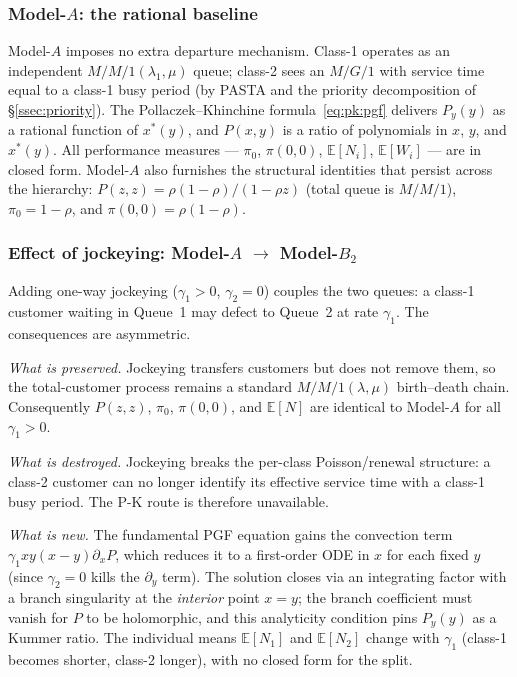 \subsubsection*{Model-\texorpdfstring{$A$}{A}: the rational baseline}

Model-$A$ imposes no extra departure mechanism.
Class-1 operates as an independent $M/M/1(\lambda_1,\mu)$ queue;
class-2 sees an $M/G/1$ with service time equal to a class-1 busy period
(by PASTA and the priority decomposition of \S\ref{ssec:priority}).
The Pollaczek--Khinchine formula~\eqref{eq:pk:pgf} delivers $P_y(y)$
as a rational function of $x^*(y)$, and $P(x,y)$ is a ratio of polynomials
in $x$, $y$, and $x^*(y)$.  All performance measures --- $\pi_0$, $\pi(0,0)$,
$\mathbb{E}[N_i]$, $\mathbb{E}[W_i]$ --- are in closed form.  Model-$A$ also
furnishes the structural identities that persist across the hierarchy:
$P(z,z)=\rho(1-\rho)/(1-\rho z)$ (total queue is $M/M/1$),
$\pi_0=1-\rho$, and $\pi(0,0)=\rho(1-\rho)$.

\subsubsection*{Effect of jockeying: Model-\texorpdfstring{$A$}{A} \texorpdfstring{$\to$}{->} Model-\texorpdfstring{$B_2$}{B2}}

Adding one-way jockeying ($\gamma_1>0$, $\gamma_2=0$) couples the two queues:
a class-1 customer waiting in Queue~1 may defect to Queue~2 at rate $\gamma_1$.
The consequences are asymmetric.

\emph{What is preserved.}
Jockeying transfers customers but does not remove them, so the total-customer
process remains a standard $M/M/1(\lambda,\mu)$ birth--death chain.
Consequently $P(z,z)$, $\pi_0$, $\pi(0,0)$, and $\mathbb{E}[N]$ are identical
to Model-$A$ for all $\gamma_1>0$.

\emph{What is destroyed.}
Jockeying breaks the per-class Poisson/renewal structure: a class-2 customer
can no longer identify its effective service time with a class-1 busy period.
The P-K route is therefore unavailable.

\emph{What is new.}
The fundamental PGF equation gains the convection term
$\gamma_1 xy(x-y)\partial_x P$, which reduces it to a first-order ODE in $x$
for each fixed $y$ (since $\gamma_2=0$ kills the $\partial_y$ term).
The solution closes via an integrating factor with a branch singularity at the
\emph{interior} point $x=y$; the branch coefficient must vanish for $P$ to be
holomorphic, and this analyticity condition pins $P_y(y)$ as a Kummer ratio.
The individual means $\mathbb{E}[N_1]$ and $\mathbb{E}[N_2]$ change with
$\gamma_1$ (class-1 becomes shorter, class-2 longer), with no closed form for
the split.


